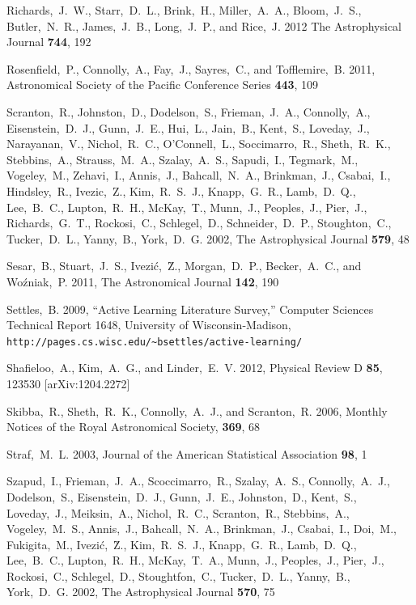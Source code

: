 \documentclass[useAMS,usenatbib,tightenlines,11pt,preprint]{aastex}
\begin{document}
\begin{thebibliography}{99}
Richards,~J.~W., Starr,~D.~L., Brink,~H., Miller,~A.~A., Bloom,~J.~S.,
Butler,~N.~R., James,~J.~B., Long,~J.~P., and Rice,~J. 2012
The Astrophysical Journal {\bf 744}, 192

Rosenfield,~P., Connolly,~A., Fay,~J., Sayres,~C., and Tofflemire,~B. 2011,
Astronomical Society of the Pacific Conference Series {\bf 443}, 109

Scranton,~R., Johnston,~D., Dodelson,~S., Frieman,~J.~A., Connolly,~A.,
Eisenstein,~D.~J., Gunn,~J.~E., Hui,~L., Jain,~B., Kent,~S., Loveday,~J.,
Narayanan,~V., Nichol,~R.~C., O'Connell,~L., Soccimarro,~R., Sheth,~R.~K.,
Stebbins,~A., Strauss,~M.~A., Szalay,~A.~S., Sapudi,~I., Tegmark,~M.,
Vogeley,~M., Zehavi,~I., Annis,~J., Bahcall,~N.~A., Brinkman,~J., Csabai,~I.,
Hindsley,~R., Ivezic,~Z., Kim,~R.~S.~J., Knapp,~G.~R., Lamb,~D.~Q., Lee,~B.~C.,
Lupton,~R.~H., McKay,~T., Munn,~J., Peoples,~J., Pier,~J., Richards,~G.~T.,
Rockosi,~C., Schlegel,~D., Schneider,~D.~P., Stoughton,~C., Tucker,~D.~L.,
Yanny,~B., York,~D.~G. 2002, The Astrophysical Journal {\bf 579}, 48

Sesar,~B., Stuart,~J.~S., Ivezi\'c,~\u Z., Morgan,~D.~P., Becker,~A.~C., and
Wo\'zniak,~P. 2011, The Astronomical Journal {\bf 142}, 190

Settles,~B. 2009, ``Active Learning Literature Survey,'' Computer Sciences Technical
Report 1648, University of Wisconsin-Madison,
\verb|http://pages.cs.wisc.edu/~bsettles/active-learning/|


Shafieloo,~A., Kim,~A.~G., and Linder,~E.~V. 2012,
Physical Review D {\bf 85}, 123530 [arXiv:1204.2272]


Skibba,~R., Sheth,~R.~K., Connolly,~A.~J., and Scranton,~R. 2006,
Monthly Notices of the Royal Astronomical Society, {\bf 369}, 68

Straf,~M.~L. 2003, Journal of the American Statistical Association {\bf 98}, 1

Szapud,~I., Frieman,~J.~A., Scoccimarro,~R., Szalay,~A.~S., Connolly,~A.~J.,
Dodelson,~S., Eisenstein,~D.~J., Gunn,~J.~E., Johnston,~D., Kent,~S.,
Loveday,~J., Meiksin,~A., Nichol,~R.~C., Scranton,~R., Stebbins,~A.,
Vogeley,~M.~S., Annis,~J., Bahcall,~N.~A., Brinkman,~J., Csabai,~I., Doi,~M.,
Fukigita,~M., Ivezi\'c,~\u Z., Kim,~R.~S.~J., Knapp,~G.~R., Lamb,~D.~Q.,
Lee,~B.~C., Lupton,~R.~H., McKay,~T.~A., Munn,~J., Peoples,~J., Pier,~J.,
Rockosi,~C., Schlegel,~D., Stoughtfon,~C., Tucker,~D.~L., Yanny,~B., York,~D.~G.
2002, The Astrophysical Journal {\bf 570}, 75


\end{thebibliography}
\end{document}
